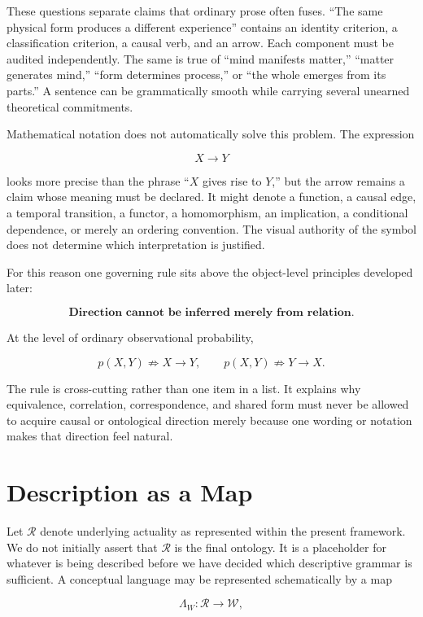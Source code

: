 These questions separate claims that ordinary prose often fuses. ``The same physical form produces a different experience'' contains an identity criterion, a classification criterion, a causal verb, and an arrow. Each component must be audited independently. The same is true of ``mind manifests matter,'' ``matter generates mind,'' ``form determines process,'' or ``the whole emerges from its parts.'' A sentence can be grammatically smooth while carrying several unearned theoretical commitments.

Mathematical notation does not automatically solve this problem. The expression

\[
X\longrightarrow Y
\]

looks more precise than the phrase ``$X$ gives rise to $Y$,'' but the arrow remains a claim whose meaning must be declared. It might denote a function, a causal edge, a temporal transition, a functor, a homomorphism, an implication, a conditional dependence, or merely an ordering convention. The visual authority of the symbol does not determine which interpretation is justified.

For this reason one governing rule sits above the object-level principles developed later:

\[
\boxed{
\textbf{Direction cannot be inferred merely from relation.}
}
\]

At the level of ordinary observational probability,

\[
p(X,Y)\nRightarrow X\longrightarrow Y,
\qquad
p(X,Y)\nRightarrow Y\longrightarrow X.
\]

The rule is cross-cutting rather than one item in a list. It explains why equivalence, correlation, correspondence, and shared form must never be allowed to acquire causal or ontological direction merely because one wording or notation makes that direction feel natural.

\section{Description as a Map}

Let $\mathscr{R}$ denote underlying actuality as represented within the present framework. We do not initially assert that $\mathscr{R}$ is the final ontology. It is a placeholder for whatever is being described before we have decided which descriptive grammar is sufficient. A conceptual language may be represented schematically by a map

\[
\Lambda_W : \mathscr{R} \longrightarrow \mathcal{W},
\]

